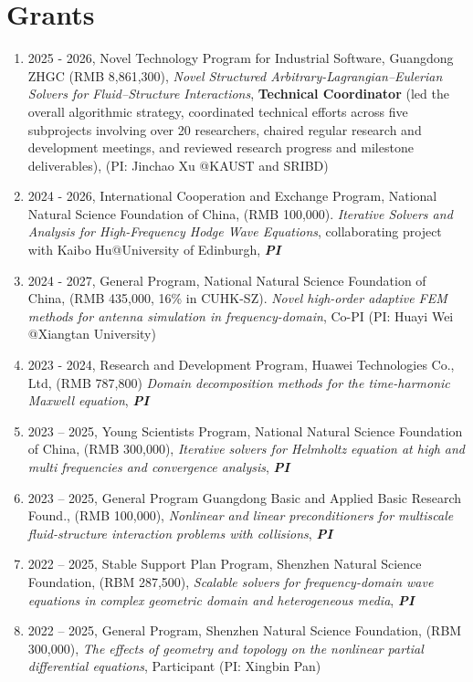 \documentclass[letterpaper]{article}
\begin{document}
\section*{Grants}
\begin{enumerate}[leftmargin=*]


\item 2025 - 2026, Novel Technology Program for Industrial Software, Guangdong ZHGC 
(RMB 8,861,300), 
\emph{Novel Structured Arbitrary-Lagrangian--Eulerian Solvers for Fluid--Structure Interactions}, 
\textbf{Technical Coordinator} 
(led the overall algorithmic strategy, coordinated technical efforts across five subprojects involving over 20 researchers, chaired regular research and development meetings, and reviewed research progress and milestone deliverables),  (PI: Jinchao Xu @KAUST and SRIBD) 


\item 2024 - 2026, International  Cooperation and Exchange Program, National Natural Science Foundation of China,  (RMB 100,000). \emph{Iterative Solvers and Analysis for High-Frequency Hodge Wave Equations}, collaborating project with Kaibo Hu@University of Edinburgh, {\bf\emph{ PI}}

\item 2024 - 2027,  General Program, National Natural Science Foundation of China,  (RMB 435,000, 16\% in CUHK-SZ). \emph{Novel high-order adaptive FEM methods for antenna simulation in frequency-domain}, Co-PI  (PI: Huayi Wei @Xiangtan University)

\item 2023 - 2024, Research and Development Program,  Huawei Technologies Co., Ltd, (RMB 787,800) \emph{Domain decomposition methods for the time-harmonic Maxwell equation}, {\bf\emph{ PI}}

\item 2023 – 2025,  Young Scientists Program,  National Natural Science Foundation of China, (RMB 300,000), \emph{Iterative solvers for Helmholtz equation at high and multi frequencies and convergence analysis}, {\bf\emph{ PI}}
\item 2023 – 2025, General Program Guangdong Basic and Applied Basic Research Found.,  (RMB 100,000), \emph{Nonlinear and linear preconditioners for multiscale fluid-structure interaction problems with collisions}, {\bf\emph{ PI}}
\item 2022 – 2025,  Stable Support Plan Program, Shenzhen Natural Science Foundation,  (RBM 287,500), \emph{Scalable solvers for frequency-domain wave equations in complex geometric domain  and heterogeneous media}, {\bf\emph{ PI}}

\item 2022 – 2025, General Program, Shenzhen Natural Science Foundation,  (RBM 300,000), \emph{The effects of geometry and topology on the nonlinear partial differential equations}, Participant (PI: Xingbin Pan)
\end{enumerate}
\end{document}
